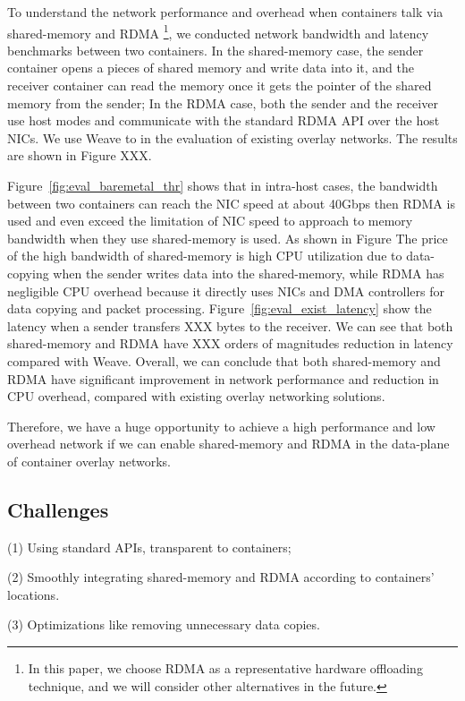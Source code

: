 To understand the network performance and overhead when containers
talk via shared-memory and RDMA \footnote{In this paper, we choose RDMA
as a representative hardware offloading technique, and we will consider other
alternatives in the future.}, we conducted network bandwidth and latency benchmarks between two containers. In the shared-memory case, the sender
container opens a pieces of shared memory and write data into it, and 
the receiver container can read the memory once it gets the pointer of 
the shared memory from the sender; In the RDMA case, both the sender
and the receiver use host modes and communicate with the standard RDMA API
over the host NICs. We use Weave to in the evaluation of existing overlay
networks. The results are shown in Figure XXX.

Figure~\ref{fig:eval_baremetal_thr} shows that in intra-host cases, the bandwidth between two
containers can reach the NIC speed at about 40Gbps then RDMA is used and 
even exceed the limitation of NIC speed to approach to memory bandwidth when
they use shared-memory is used. As shown in Figure The price of the high bandwidth of shared-memory is high CPU utilization due to data-copying when the sender writes data into
the shared-memory, while RDMA has negligible CPU overhead because it directly uses NICs and DMA controllers for data copying and packet processing.
Figure~\ref{fig:eval_exist_latency} show the latency when a sender 
transfers XXX bytes to the receiver. We can see that both shared-memory
and RDMA have XXX orders of magnitudes reduction in latency compared with Weave.
Overall, we can conclude that both shared-memory and RDMA have 
significant improvement in network performance and reduction in CPU overhead,
compared with existing overlay networking solutions.

Therefore, we have a huge opportunity to achieve a high performance
and low overhead network if we can enable shared-memory and RDMA 
in the data-plane of container overlay networks.

\subsection{Challenges}

(1) Using standard APIs, transparent to containers;


(2) Smoothly integrating shared-memory and RDMA according to containers' locations.

(3) Optimizations like removing unnecessary data copies.

